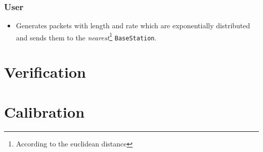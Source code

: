 \documentclass{article}
\begin{document}
\subsubsection{User}
\begin{itemize}
    \item Generates packets with length and rate which are exponentially distributed and sends them to the \textit{nearest}\footnote{According to the euclidean distance}
    \texttt{BaseStation}.
\end{itemize}

\newpage
\section{Verification}

\section{Calibration}
\end{document}
